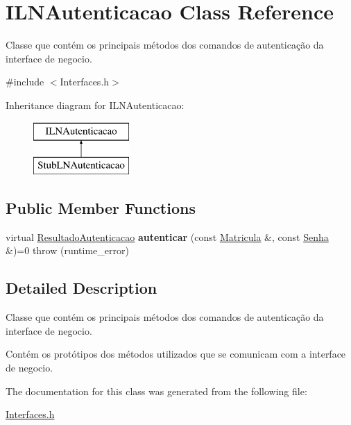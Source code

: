 \hypertarget{class_i_l_n_autenticacao}{}\section{I\+L\+N\+Autenticacao Class Reference}
\label{class_i_l_n_autenticacao}


Classe que contém os principais métodos dos comandos de autenticação da interface de negocio.  




{\ttfamily \#include $<$Interfaces.\+h$>$}

Inheritance diagram for I\+L\+N\+Autenticacao\+:\begin{figure}[H]
\begin{center}
\leavevmode
\includegraphics[height=2.000000cm]{class_i_l_n_autenticacao}
\end{center}
\end{figure}
\subsection*{Public Member Functions}
\begin{DoxyCompactItemize}
\item 
\hypertarget{class_i_l_n_autenticacao_ac73f153e0e417aaf5cd07fe497d74f87}{}\label{class_i_l_n_autenticacao_ac73f153e0e417aaf5cd07fe497d74f87} 
virtual \hyperlink{class_resultado_autenticacao}{Resultado\+Autenticacao} {\bfseries autenticar} (const \hyperlink{class_matricula}{Matricula} \&, const \hyperlink{class_senha}{Senha} \&)=0  throw (runtime\+\_\+error)
\end{DoxyCompactItemize}


\subsection{Detailed Description}
Classe que contém os principais métodos dos comandos de autenticação da interface de negocio. 

Contém os protótipos dos métodos utilizados que se comunicam com a interface de negocio. 

The documentation for this class was generated from the following file\+:\begin{DoxyCompactItemize}
\item 
\hyperlink{_interfaces_8h}{Interfaces.\+h}\end{DoxyCompactItemize}
